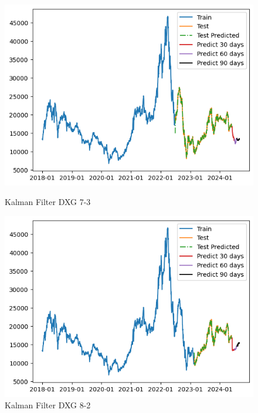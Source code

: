 \documentclass[conference]{IEEEtran}
\begin{document}
\begin{figure}[htbp]
    \begin{minipage}{0.23\textwidth}
    \centering
    \includegraphics[width=1\textwidth]{experiment/kf/DXG 7-3.png}
    \caption{Kalman Filter DXG 7-3}
    \label{fig:nvl_boxplot}
    \end{minipage}
    \hfill
    \begin{minipage}{0.23\textwidth}
    \centering
    \includegraphics[width=1\textwidth]{experiment/kf/DXG 8-2.png}
    \caption{Kalman Filter DXG 8-2}
    \label{fig:nvl_histogram}
    \end{minipage}
    \begin{minipage}{0.23\textwidth}
    \centering

\end{minipage}
\end{figure}
\end{document}
